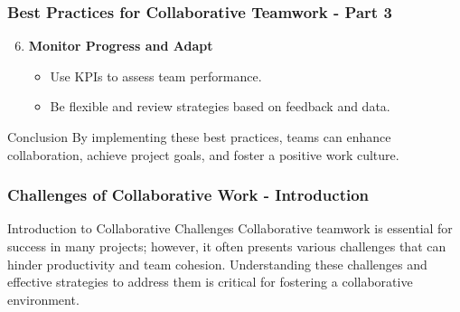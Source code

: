 \documentclass[aspectratio=169]{beamer}
\begin{document}
\begin{frame}[fragile]
    \frametitle{Best Practices for Collaborative Teamwork - Part 3}
    \begin{enumerate}
        \setcounter{enumi}{5} %
        \item \textbf{Monitor Progress and Adapt}
            \begin{itemize}
                \item Use KPIs to assess team performance.
                \item Be flexible and review strategies based on feedback and data.
            \end{itemize}
    \end{enumerate}

    \begin{block}{Conclusion}
        By implementing these best practices, teams can enhance collaboration, achieve project goals, and foster a positive work culture.
    \end{block}
\end{frame}

\begin{frame}[fragile]
  \frametitle{Challenges of Collaborative Work - Introduction}
  \begin{block}{Introduction to Collaborative Challenges}
    Collaborative teamwork is essential for success in many projects; however, it often presents various challenges that can hinder productivity and team cohesion. Understanding these challenges and effective strategies to address them is critical for fostering a collaborative environment.
  \end{block}
\end{frame}
\end{document}
